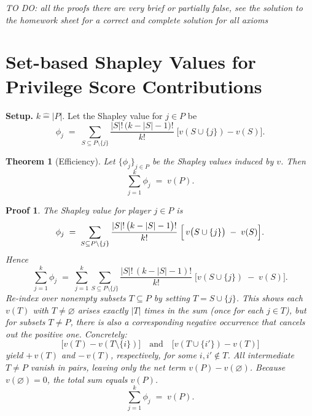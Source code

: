 \documentclass{article}
\begin{document}
\newtheorem{theorem}{Theorem}
\newtheorem{proof_sketch}{Proof}
\newtheorem{proofsketch}{Proof (Step-by-Step)}

\textit{TO DO: all the proofs there are very brief or partially false, see the solution to the homework sheet for a correct and complete solution for all axioms}

\section*{Set-based Shapley Values for Privilege Score Contributions}

\textbf{Setup.} 
$k \hat{=} |P|$. Let the Shapley value for $j \in P$ be
\[
\phi_j \;=\;
\sum_{S \subseteq P \setminus \{j\}}
\frac{|S|!\,\bigl(k - |S| -1\bigr)!}{k!}
\;
\bigl[v(S \cup \{j\}) - v(S)\bigr].
\]

\begin{theorem}[Efficiency]
Let $\{\phi_j\}_{j \in P}$ be the Shapley values induced by $v$. Then
\[
\sum_{j=1}^k \phi_j
\;=\;
v(P).
\]
\end{theorem}

\begin{proof_sketch}
The Shapley value for player $j \in P$ is 
\[
\phi_j 
\;=\;
\sum_{S \subseteq P \setminus \{j\}}
\frac{|S|!\,\bigl(k - |S| - 1\bigr)!}{k!}
\;\Bigl[\,v\bigl(S \cup \{j\}\bigr) \;-\; v(S)\Bigr].
\]
Hence
\[
\sum_{j=1}^k \phi_j
\;=\;
\sum_{j=1}^k
\sum_{S \subseteq P \setminus \{j\}}
\frac{|S|!\,(k - |S| - 1)!}{k!}
\;\bigl[v(S \cup \{j\}) \;-\; v(S)\bigr].
\]
Re-index over nonempty subsets $T \subseteq P$ by setting $T = S \cup \{j\}$. This shows each $v(T)$ with $T\neq \varnothing$ arises exactly $|T|$ times in the sum (once for each $j \in T$), but for subsets $T \neq P$, there is also a corresponding negative occurrence that cancels out the positive one. Concretely:
\[
\bigl[v(T) - v(T \setminus \{i\})\bigr]
\quad \text{and} \quad
\bigl[v(T \cup \{i'\}) - v(T)\bigr]
\]
yield $+\,v(T)$ and $-\,v(T)$, respectively, for some $i,i'\notin T$. 
All intermediate $T \neq P$ vanish in pairs, leaving only the net term $v(P) - v(\varnothing)$. Because $v(\varnothing)=0$, the total sum equals $v(P)$. 
\[
\sum_{j=1}^k \phi_j \;=\; v(P).
\]
\end{proof_sketch}
\end{document}

